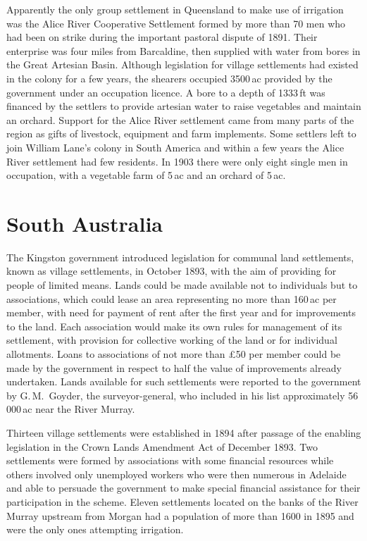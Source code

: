 Apparently the only group settlement in Queensland to make use of
irrigation was the Alice River Cooperative Settlement formed by more
than 70 men who had been on strike during the important pastoral
dispute of 1891.  Their enterprise was four miles from Barcaldine,
then supplied with water from bores in the Great Artesian Basin.
Although legislation for village settlements had existed in the colony
for a few years, the shearers occupied 3500\,ac provided by the
government under an occupation licence.  A bore to a depth of 1333\,ft
was financed by the settlers to provide artesian water to raise
vegetables and maintain an orchard.  Support for the Alice River
settlement came from many parts of the region as gifts of livestock,
equipment and farm implements. Some settlers left to join William
Lane's colony in South America and within a few years the Alice River
settlement had few residents. In 1903 there were only eight single men
in occupation, with a vegetable farm of 5\,ac and an orchard of
5\,ac.

\section*{South Australia}

The Kingston government introduced legislation for communal land
settlements, known as village settlements, in October 1893, with the
aim of providing for people of limited means.  Lands could be made
available not to individuals but to associations, which could lease an
area representing no more than 160\,ac per member, with need for
payment of rent after the first year and for improvements to the land.
Each association would make its own rules for management of its
settlement, with provision for collective working of the land or for
individual allotments.  Loans to associations of not more than
\pounds50 per member could be made by the government in respect to
half the value of improvements already undertaken.  Lands available
for such settlements were reported to the government by G.\,M.~Goyder,
the surveyor-general, who included in his list approximately
56\,000\,ac near the River Murray.\fn{SAPP 154 of 1893.}

Thirteen village settlements were established in 1894 after passage of
the enabling legislation in the Crown Lands Amendment Act of December
1893.  Two settlements were formed by associations with some financial
resources while others involved only unemployed workers who were then
numerous in Adelaide and able to persuade the government to make
special financial assistance for their participation in the scheme.
Eleven settlements located on the banks of the River Murray upstream
from Morgan had a population of more than 1600 in 1895 and were the
only ones attempting irrigation.

